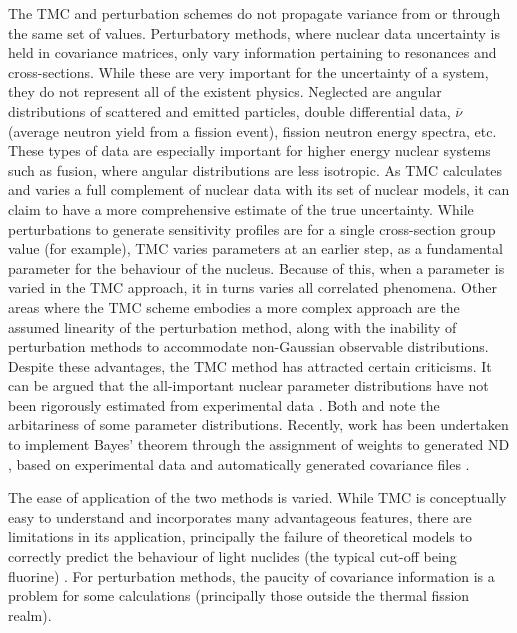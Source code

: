 The TMC and perturbation schemes do not propagate variance from or through the same set of values. Perturbatory methods, where nuclear data uncertainty is held in covariance matrices, only vary information pertaining to resonances and cross-sections. While these are very important for the uncertainty of a system, they do not represent all of the existent physics. Neglected are angular distributions of scattered and emitted particles, double differential data, $\overline{\nu}$ (average neutron yield from a fission event), fission neutron energy spectra, etc. These types of data are especially important for higher energy nuclear systems such as fusion, where angular distributions are less isotropic. As TMC calculates and varies a full complement of nuclear data with its set of nuclear models, it can claim to have a more comprehensive estimate of the true uncertainty. While perturbations to generate sensitivity profiles are for a single cross-section group value (for example), TMC varies parameters at an earlier step, as a fundamental parameter for the behaviour of the nucleus. Because of this, when a parameter is varied in the TMC approach, it in turns varies all correlated phenomena. Other areas where the TMC scheme embodies a more complex approach are the assumed linearity of the perturbation method, along with the inability of perturbation methods to accommodate non-Gaussian observable distributions. Despite these advantages, the TMC method has attracted certain criticisms. It can be argued that the all-important nuclear parameter distributions have not been rigorously estimated from experimental data \cite{Helgesson2017}. Both \citeauthor{Capote2010} and \citeauthor{Rising2012} note the arbitariness of some parameter distributions. Recently, work has been undertaken to implement Bayes' theorem through the assignment of weights to generated ND \cite{Koning2015a}, based on experimental data and automatically generated covariance files \cite{Helgesson2017}.

The ease of application of the two methods is varied. While TMC is conceptually easy to understand and incorporates many advantageous features, there are limitations in its application, principally the failure of theoretical models to correctly predict the behaviour of light nuclides (the typical cut-off being fluorine) \cite{Rochman2011}. For perturbation methods, the paucity of covariance information is a problem for some calculations (principally those outside the thermal fission realm). 

\FloatBarrier
